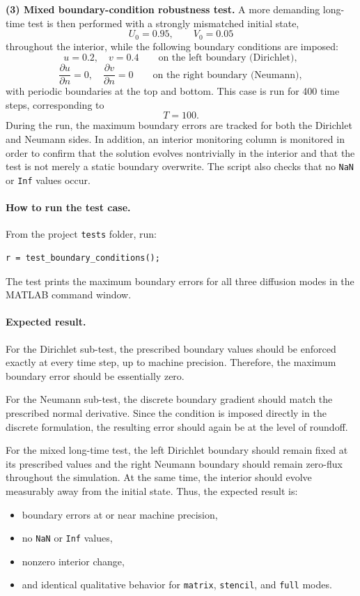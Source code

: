 \medskip
\noindent
\textbf{(3) Mixed boundary-condition robustness test.}
A more demanding long-time test is then performed with a strongly mismatched initial state,
\[
U_0 = 0.95, \qquad V_0 = 0.05
\]
throughout the interior, while the following boundary conditions are imposed:
\[
u=0.2,\quad v=0.4 \qquad \text{on the left boundary (Dirichlet)},
\]
\[
\frac{\partial u}{\partial n}=0,\quad \frac{\partial v}{\partial n}=0
\qquad \text{on the right boundary (Neumann)},
\]
with periodic boundaries at the top and bottom. This case is run for 400 time steps, corresponding to
\[
T = 100.
\]
During the run, the maximum boundary errors are tracked for both the Dirichlet and Neumann sides. In addition, an interior monitoring column is monitored in order to confirm that the solution evolves nontrivially in the interior and that the test is not merely a static boundary overwrite. The script also checks that no \texttt{NaN} or \texttt{Inf} values occur.

\paragraph{How to run the test case.}
From the project \texttt{tests} folder, run:
\begin{verbatim}
r = test_boundary_conditions();
\end{verbatim}

The test prints the maximum boundary errors for all three diffusion modes in the MATLAB command window.

\paragraph{Expected result.}
For the Dirichlet sub-test, the prescribed boundary values should be enforced exactly at every time step, up to machine precision. Therefore, the maximum boundary error should be essentially zero.

For the Neumann sub-test, the discrete boundary gradient should match the prescribed normal derivative. Since the condition is imposed directly in the discrete formulation, the resulting error should again be at the level of roundoff.

For the mixed long-time test, the left Dirichlet boundary should remain fixed at its prescribed values and the right Neumann boundary should remain zero-flux throughout the simulation. At the same time, the interior should evolve measurably away from the initial state. Thus, the expected result is:
\begin{itemize}
    \item boundary errors at or near machine precision,
    \item no \texttt{NaN} or \texttt{Inf} values,
    \item nonzero interior change,
    \item and identical qualitative behavior for \texttt{matrix}, \texttt{stencil}, and \texttt{full} modes.
\end{itemize}

